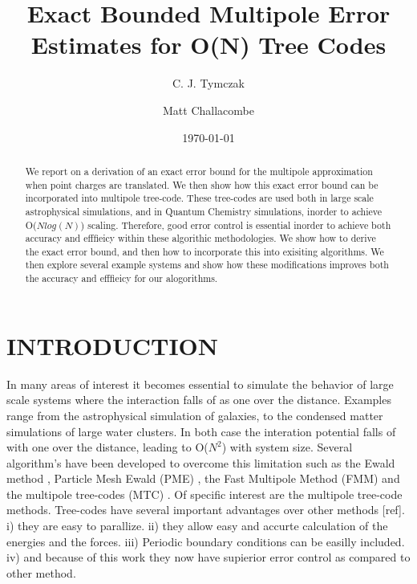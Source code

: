 \documentclass[prb,aps,nobibnotes,superbib,preprint]{revtex4}
\begin{document}
\title{\textbf{Exact Bounded Multipole Error Estimates for O(N) Tree Codes}}

\author{C. J. Tymczak}
\author{Matt Challacombe}


\date{\today}

\begin{abstract}
We report on a derivation of an exact error bound for the multipole approximation when point 
charges are translated. We then show how this exact error bound can be incorporated into
multipole tree-code. These tree-codes are used both in large scale astrophysical 
simulations, and in Quantum Chemistry simulations, inorder to achieve {\cal O}($N log(N)$) 
scaling. Therefore, good error control is essential inorder to achieve both 
accuracy and efffieicy within these algorithic methodologies. We show how to derive the
exact error bound, and then how to incorporate this into exisiting algorithms. We then explore 
several example systems and show how these modifications improves both the accuracy and efffieicy 
for our alogorithms.
\end{abstract}


\maketitle

\section{INTRODUCTION}

In many areas of interest it becomes essential to simulate 
the behavior of large scale systems where the interaction 
falls of as one over the distance. Examples range from  the astrophysical simulation
of galaxies, to the condensed matter simulations of large water clusters. 
In both case the interation potential falls of with one over the distance, 
leading to  {\cal O}($N^2$) with system size. Several algorithm's have been developed to
overcome this limitation such as the Ewald method \cite{DFincham94}, 
Particle Mesh Ewald (PME) \cite{luty:94}, 
the Fast Multipole Method (FMM) \cite{Singh93,shimada:94,singer:95a}
and the multipole tree-codes (MTC) \cite{Salmon94}. 
Of specific interest are the multipole tree-code methods. 
Tree-codes have several important advantages over other methods [ref]. i) they are easy to parallize.
ii) they allow easy and accurte calculation of the energies and the forces. iii) Periodic boundary
conditions can be easilly included. iv) and because of this work they
now have supierior error control as compared to other method.
\end{document}

